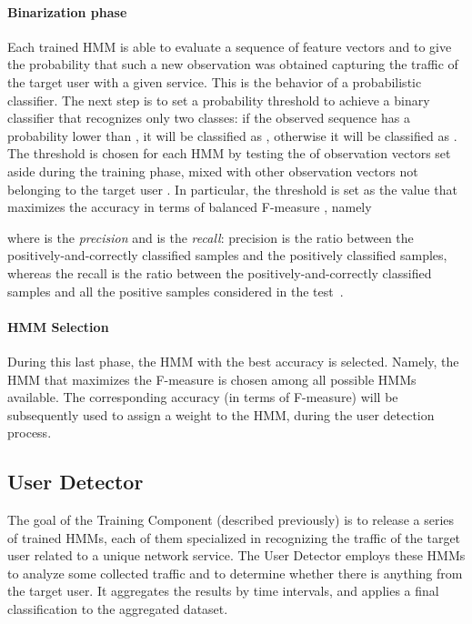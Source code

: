 \documentclass[10pt,conference,compsocconf,letterpaper]{IEEEtran}
\begin{document}
\paragraph{Binarization phase}
Each trained HMM is able to evaluate a sequence of feature vectors and
to give the probability that such a new observation was obtained
capturing the traffic of the target user with a given service. This is the
behavior of a probabilistic classifier. The next step is to set a
probability threshold to achieve a binary classifier that recognizes
only two classes: if the observed sequence has a probability lower
than , it will be classified as , otherwise it will be
classified as . The threshold  is chosen for each HMM by
testing the  of observation vectors set aside during the training
phase, mixed with other observation vectors not belonging to the
target user . In particular,  the threshold is set as the value that
maximizes the accuracy in terms of balanced F-measure , namely

where  is the \textit{precision} and  is the \textit{recall}:
precision is the ratio between the positively-and-correctly classified
samples and the positively classified samples, whereas the recall is
the ratio between the positively-and-correctly classified samples and
all the positive samples considered in the test~\cite{Baeza-Yates:1999:MIR:553876}.


\paragraph{HMM Selection}
During this last phase, the HMM with the best accuracy is selected. 
Namely, the HMM that maximizes the F-measure is chosen 
among all  possible HMMs available. The corresponding accuracy (in terms of F-measure) will be subsequently used to
assign a weight to the HMM, during the user detection process. 

\subsection{User Detector}
The goal of the Training Component (described previously) is to release a series of
trained HMMs, each of them specialized in recognizing the traffic
of the target user related to a unique network service. The User Detector employs 
these HMMs to analyze some collected traffic and to determine whether there is anything from the target user. 
It aggregates the results by time intervals, and
applies a final 
classification to the aggregated dataset. 
\end{document}
